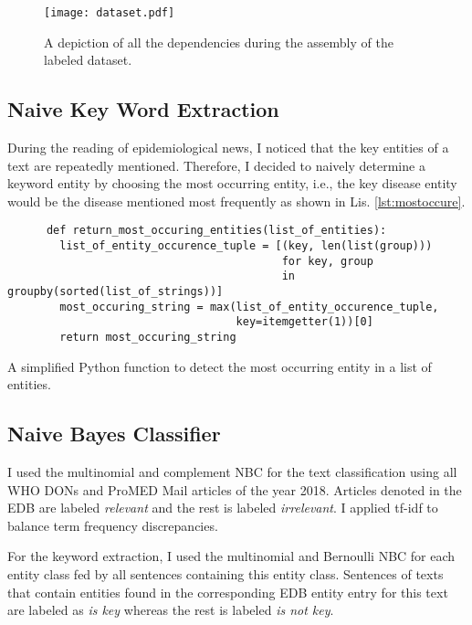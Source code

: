   \begin{figure}[h!]
    \centering
    \texttt{[image: dataset.pdf]}
    \caption{A depiction of all the dependencies during the assembly of the labeled dataset.}
    \label{fig:dataset}
  \end{figure}


\subsection{Naive Key Word Extraction}
  During the reading of epidemiological news, I noticed that the key entities of a text are repeatedly mentioned.
  Therefore, I decided to naively determine a keyword entity by choosing the most occurring entity, i.e., the key disease entity would be the disease mentioned most frequently as shown in Lis. \ref{lst:mostoccure}.
  \begin{listing}[h!]
    \begin{verbatim}
      def return_most_occuring_entities(list_of_entities):
        list_of_entity_occurence_tuple = [(key, len(list(group)))
                                          for key, group
                                          in groupby(sorted(list_of_strings))]
        most_occuring_string = max(list_of_entity_occurence_tuple,
                                   key=itemgetter(1))[0]
        return most_occuring_string
    \end{verbatim}
    \caption{A simplified Python function to detect the most occurring entity in a list of entities.}
    \label{lst:mostoccure}
  \end{listing}

\subsection{Naive Bayes Classifier}\label{iskey}
  I used the multinomial and complement NBC for the text classification using all WHO DONs and ProMED Mail articles of the year 2018.
  Articles denoted in the EDB are labeled \textsl{relevant} and the rest is labeled \textsl{irrelevant}.
  I applied tf-idf to balance term frequency discrepancies.

  For the keyword extraction, I used the multinomial and Bernoulli NBC for each entity class fed by all sentences containing this entity class.
  Sentences of texts that contain entities found in the corresponding EDB entity entry for this text are labeled as \textsl{is key} whereas the rest is labeled \textsl{is not key}.

